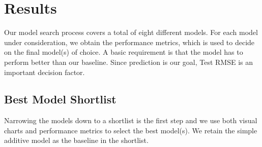 \documentclass[
]{article}
\newenvironment{Shaded}{\begin{snugshade}}{\end{snugshade}}
\newcommand{\DataTypeTok}[1]{\textcolor[rgb]{0.13,0.29,0.53}{#1}}
\newcommand{\DecValTok}[1]{\textcolor[rgb]{0.00,0.00,0.81}{#1}}
\newcommand{\KeywordTok}[1]{\textcolor[rgb]{0.13,0.29,0.53}{\textbf{#1}}}
\newcommand{\NormalTok}[1]{#1}
\newcommand{\OperatorTok}[1]{\textcolor[rgb]{0.81,0.36,0.00}{\textbf{#1}}}
\newcommand{\StringTok}[1]{\textcolor[rgb]{0.31,0.60,0.02}{#1}}
\begin{document}
\hypertarget{results}{%
\section{Results}\label{results}}

Our model search process covers a total of eight different models. For
each model under consideration, we obtain the performance metrics, which
is used to decide on the final model(s) of choice. A basic requirement
is that the model has to perform better than our baseline. Since
prediction is our goal, Test RMSE is an important decision factor.

\hypertarget{best-model-shortlist}{%
\subsection{Best Model Shortlist}\label{best-model-shortlist}}

Narrowing the models down to a shortlist is the first step and we use
both visual charts and performance metrics to select the best model(s).
We retain the simple additive model as the baseline in the shortlist.

\begin{Shaded}
\end{Shaded}
\end{document}
